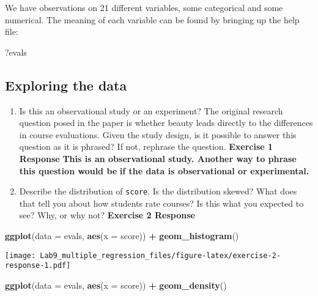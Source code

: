 \documentclass[
]{article}
\newenvironment{Shaded}{\begin{snugshade}}{\end{snugshade}}
\newcommand{\AttributeTok}[1]{\textcolor[rgb]{0.13,0.29,0.53}{#1}}
\newcommand{\FunctionTok}[1]{\textcolor[rgb]{0.13,0.29,0.53}{\textbf{#1}}}
\newcommand{\NormalTok}[1]{#1}
\newcommand{\SpecialCharTok}[1]{\textcolor[rgb]{0.81,0.36,0.00}{\textbf{#1}}}
\begin{document}
We have observations on 21 different variables, some categorical and
some numerical. The meaning of each variable can be found by bringing up
the help file:

\begin{Shaded}
\begin{Highlighting}[]
\NormalTok{?evals}
\end{Highlighting}
\end{Shaded}

\subsection{Exploring the data}\label{exploring-the-data}

\begin{enumerate}
\def\labelenumi{\arabic{enumi}.}
\item
  Is this an observational study or an experiment? The original research
  question posed in the paper is whether beauty leads directly to the
  differences in course evaluations. Given the study design, is it
  possible to answer this question as it is phrased? If not, rephrase
  the question. \textbf{Exercise 1 Response} \textbf{This is an
  observational study. Another way to phrase this question would be}
  \textbf{if the data is observational or experimental.}
\item
  Describe the distribution of \texttt{score}. Is the distribution
  skewed? What does that tell you about how students rate courses? Is
  this what you expected to see? Why, or why not? \textbf{Exercise 2
  Response}
\end{enumerate}

\begin{Shaded}
\begin{Highlighting}[]
\FunctionTok{ggplot}\NormalTok{(}\AttributeTok{data =}\NormalTok{ evals, }\FunctionTok{aes}\NormalTok{(}\AttributeTok{x =}\NormalTok{ score)) }\SpecialCharTok{+}
  \FunctionTok{geom\_histogram}\NormalTok{()}
\end{Highlighting}
\end{Shaded}

\texttt{[image: Lab9\_multiple\_regression\_files/figure-latex/exercise-2-response-1.pdf]}

\begin{Shaded}
\begin{Highlighting}[]
\FunctionTok{ggplot}\NormalTok{(}\AttributeTok{data =}\NormalTok{ evals, }\FunctionTok{aes}\NormalTok{(}\AttributeTok{x =}\NormalTok{ score)) }\SpecialCharTok{+}
  \FunctionTok{geom\_density}\NormalTok{()}
\end{Highlighting}
\end{Shaded}
\end{document}
